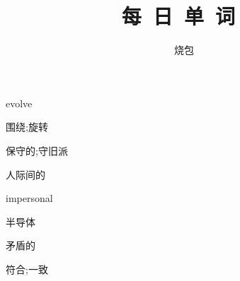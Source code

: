 \documentclass[a4paper, 12pt]{article}
\begin{document}
    \noindent

    \title{每\ 日\ 单\ 词\ }
    \author{烧包}
    \maketitle

\begin{multicols}{2}
\begin{flushleft}
evolve \ \ \ \ \underline{\hspace{3cm}}
\end{flushleft}

\begin{flushleft}
围绕;旋转 \ \ \ \ \underline{\hspace{3cm}}
\end{flushleft}
\end{multicols}

\begin{multicols}{2}
\begin{flushleft}
保守的;守旧派 \ \ \ \ \underline{\hspace{3cm}}
\end{flushleft}

\begin{flushleft}
人际间的 \ \ \ \ \underline{\hspace{3cm}}
\end{flushleft}
\end{multicols}

\begin{multicols}{2}
\begin{flushleft}
impersonal \ \ \ \ \underline{\hspace{3cm}}
\end{flushleft}

\begin{flushleft}
半导体 \ \ \ \ \underline{\hspace{3cm}}
\end{flushleft}
\end{multicols}

\begin{multicols}{2}
\begin{flushleft}
矛盾的 \ \ \ \ \underline{\hspace{3cm}}
\end{flushleft}

\begin{flushleft}
符合;一致 \ \ \ \ \underline{\hspace{3cm}}
\end{flushleft}
\end{multicols}
\end{document}
